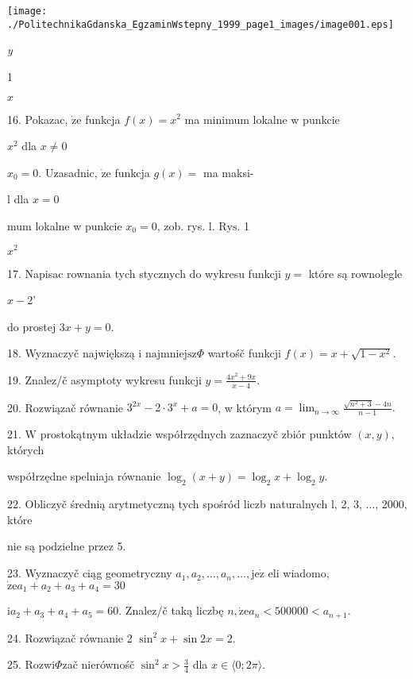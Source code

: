 \documentclass[a4paper,12pt]{article}
\begin{document}
\begin{center}
\texttt{[image: ./PolitechnikaGdanska\_EgzaminWstepny\_1999\_page1\_images/image001.eps]}
\end{center}
{\it y}

1

$x$

16. Pokazac, $\dot{\mathrm{z}}\mathrm{e}$ funkcja $f(x) = x^{2}$ ma minimum lokalne w punkcie

$x^{2}$ dla $x\neq 0$

$x_{0} = 0$. Uzasadnic, $\dot{\mathrm{z}}\mathrm{e}$ funkcja $g(x) =$ ma maksi-

l dla $x=0$

mum lokalne w punkcie $x_{0}=0$, zob. rys. l. $\mathrm{R}\mathrm{y}\mathrm{s}$. 1

$x^{2}$

17. Napisac rownania tych stycznych do wykresu funkcji $y=$ które są rownolegle

$x-2$'

do prostej $3x+y=0.$

18. Wyznaczyč największą i $\mathrm{n}\mathrm{a}\mathrm{j}\mathrm{m}\mathrm{n}\mathrm{i}\mathrm{e}\mathrm{j}\mathrm{s}\mathrm{z}\Phi$ wartośč funkcji $f(x)=x+\sqrt{1-x^{2}}.$

19. Znalez/č asymptoty wykresu funkcji $y=\displaystyle \frac{4x^{2}+9x}{x-4}.$

20. Rozwiązač równanie $3^{2x}-2\cdot 3^{x}+a=0$, w którym $a=\displaystyle \lim_{n\rightarrow\infty}\frac{\sqrt{n^{2}+3}-4n}{n-1}.$

21. $\mathrm{W}$ prostokątnym układzie współrzędnych zaznaczyč zbiór punktów $(x,y)$, których

współrzędne spelniaja równanie $\log_{2}(x+y)=\log_{2}x+\log_{2}y.$

22. Obliczyč średnią arytmetyczną tych spośród liczb naturalnych l, 2, 3, $\ldots$, 2000, które

nie są podzielne przez 5.

23. Wyznaczyč ciąg geometryczny $a_{1}, a_{2}, \ldots, a_{n}, \ldots, \mathrm{j}\mathrm{e}\dot{\mathrm{z}}$ eli wiadomo, $\dot{\mathrm{z}}\mathrm{e}a_{1}+a_{2}+a_{3}+a_{4}=30$

$\mathrm{i}a_{2}+a_{3}+a_{4}+a_{5}=60$. Znalez/č taką liczbę $n, \dot{\mathrm{z}}\mathrm{e}a_{n}<500000<a_{n+1}.$

24. Rozwiązač równanie 2 $\sin^{2}x+\sin 2x=2.$

25. Rozwi$\Phi$zač nierównośč $\displaystyle \sin^{2}x>\frac{3}{4}$ dla $x\in\langle 0;2\pi\rangle.$
\end{document}
